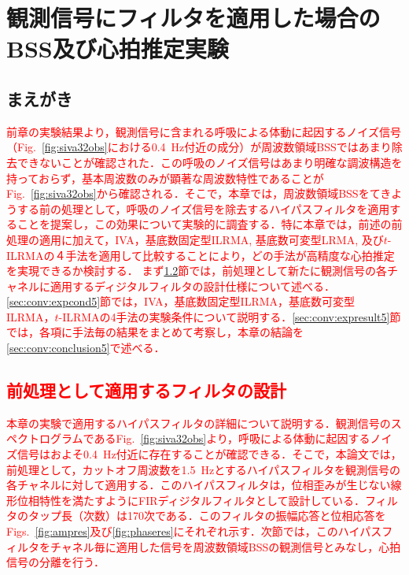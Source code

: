 \chapter{観測信号にフィルタを適用した場合のBSS及び心拍推定実験}
\label{chap:fbsshrexp}

\section{まえがき}
\textcolor{red}{前章の実験結果より，観測信号に含まれる呼吸による体動に起因するノイズ信号（Fig.~\ref{fig:siva32obs}における0.4~Hz付近の成分）が周波数領域BSSではあまり除去できないことが確認された．この呼吸のノイズ信号はあまり明確な調波構造を持っておらず，基本周波数のみが顕著な周波数特性であることがFig.~\ref{fig:siva32obs}から確認される．そこで，本章では，周波数領域BSSをてきようする前の処理として，呼吸のノイズ信号を除去するハイパスフィルタを適用することを提案し，この効果について実験的に調査する．特に本章では，前述の前処理の適用に加えて，IVA，基底数固定型ILRMA, 基底数可変型LRMA, 及び$t$-ILRMAの４手法を適用して比較することにより，どの手法が高精度な心拍推定を実現できるか検討する．
まず\ref{sec:conv:filteroutline}節では，前処理として新たに観測信号の各チャネルに適用するディジタルフィルタの設計仕様について述べる．\ref{sec:conv:expcond5}節では，IVA，基底数固定型ILRMA，基底数可変型ILRMA，$t$-ILRMAの4手法の実験条件について説明する．\ref{sec:conv:expresult5}節では，各項に手法毎の結果をまとめて考察し，本章の結論を\ref{sec:conv:conclusion5}で述べる．}

\section{\textcolor{red}{前処理として適用するフィルタの設計}}
\label{sec:conv:filteroutline}
\textcolor{red}{本章の実験で適用するハイパスフィルタの詳細について説明する．観測信号のスペクトログラムであるFig.~\ref{fig:siva32obs}より，呼吸による体動に起因するノイズ信号はおよそ0.4~Hz付近に存在することが確認できる．そこで，本論文では，前処理として，カットオフ周波数を1.5~Hzとするハイパスフィルタを観測信号の各チャネルに対して適用する．このハイパスフィルタは，位相歪みが生じない線形位相特性を満たすようにFIRディジタルフィルタとして設計している．フィルタのタップ長（次数）は170次である．このフィルタの振幅応答と位相応答をFigs.~\ref{fig:ampres}及び\ref{fig:phaseres}にそれぞれ示す．次節では，このハイパスフィルタをチャネル毎に適用した信号を周波数領域BSSの観測信号とみなし，心拍信号の分離を行う．}

